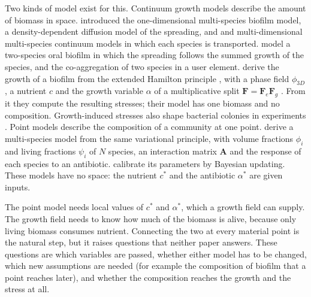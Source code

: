 \documentclass[11pt,a4paper]{article}
\newcommand{\phiD}{\phi_{3D}}
\begin{document}
Two kinds of model exist for this. Continuum growth models describe the amount of biomass in space. \citet{WannerGujer1986} introduced the one-dimensional multi-species biofilm model, \citet{Eberl2001Biofilm} a density-dependent diffusion model of the spreading, and \citet{AlpkvistKlapper2007} and \citet{Rahman2015MixedCulture} multi-dimensional multi-species continuum models in which each species is transported. \citet{Feng2021SymbioticBiofilm} model a two-species oral biofilm in which the spreading follows the summed growth of the species, and \citet{Soleimani2023CoAggregation} the co-aggregation of two species in a user element. \citet{Klempt2024DiffusionDrivenGrowth} derive the growth of a biofilm from the extended Hamilton principle \citep{JunkerBalzani2021ExtendedHamilton}, with a phase field $\phiD$, a nutrient $c$ and the growth variable $\alpha$ of a multiplicative split $\mathbf F=\mathbf F_e\mathbf F_g$ \citep[the multiplicative split of growth goes back to][]{Rodriguez1994Growth}. From it they compute the resulting stresses; their model has one biomass and no composition. Growth-induced stresses also shape bacterial colonies in experiments \citep{Seminara2012Osmotic}. Point models describe the composition of a community at one point. \citet{Klempt2026ContinuumBacterialGrowth} derive a multi-species model from the same variational principle, with volume fractions $\phi_i$ and living fractions $\psi_i$ of $N$ species, an interaction matrix $\mathbf A$ and the response of each species to an antibiotic. \citet{Fritsch2025BayesianMicrofilms} calibrate its parameters by Bayesian updating. These models have no space: the nutrient $c^*$ and the antibiotic $\alpha^*$ are given inputs.

The point model needs local values of $c^*$ and $\alpha^*$, which a growth field can supply. The growth field needs to know how much of the biomass is alive, because only living biomass consumes nutrient. Connecting the two at every material point is the natural step, but it raises questions that neither paper answers. These questions are which variables are passed, whether either model has to be changed, which new assumptions are needed (for example the composition of biofilm that a point reaches later), and whether the composition reaches the growth and the stress at all.
\end{document}

